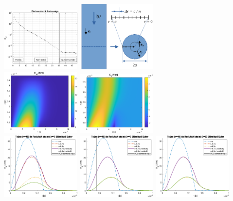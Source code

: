 \documentclass[aspectratio=43]{beamer}
\begin{document}
\begin{frame}
    \centering
    \includegraphics[width=0.3\textwidth]{kep/euler_0.15_4_sv.eps}
    \includegraphics[width=0.3\textwidth]{kep/modell.pdf}\\
    \includegraphics[width=0.3\textwidth]{kep/euler_0.15_4_hphi_waterfall.eps}
    \includegraphics[width=0.3\textwidth]{kep/euler_0.15_4_ez_waterfall.eps}\\
	\includegraphics[width=0.3\textwidth]{kep/euler_0.07_4_td.eps}
	\includegraphics[width=0.3\textwidth]{kep/euler_0.15_4_td.eps}
	\includegraphics[width=0.3\textwidth]{kep/euler_0.07_8_td.eps}
\end{frame}
\end{document}
